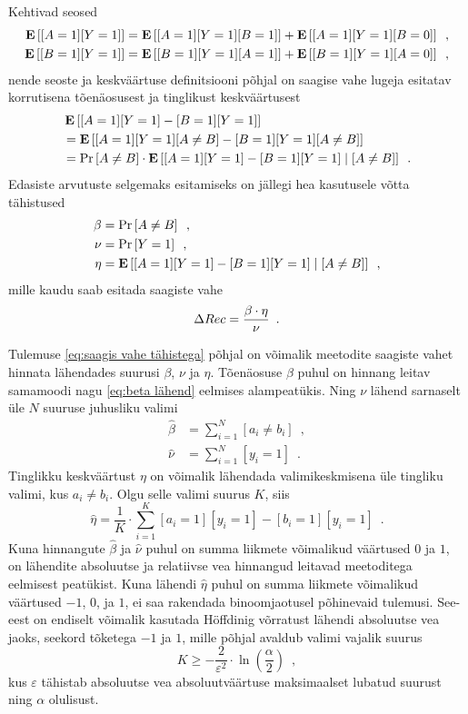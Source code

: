 Kehtivad seosed
\begin{align*}
    \operatorname*{\mathbf{E}}\left[[A=1][Y=1]\right] &= \operatorname*{\mathbf{E}}\left[[A=1][Y=1][B=1]\right] + \operatorname*{\mathbf{E}}\left[[A=1][Y=1][B=0]\right] \enspace, \\
    \operatorname*{\mathbf{E}}\left[[B=1][Y=1]\right] &= \operatorname*{\mathbf{E}}\left[[B=1][Y=1][A=1]\right] + \operatorname*{\mathbf{E}}\left[[B=1][Y=1][A=0]\right] \enspace,
\end{align*}
nende seoste ja keskväärtuse definitsiooni põhjal on saagise vahe lugeja esitatav korrutisena tõenäosusest ja tinglikust keskväärtusest
\begin{align*}
    &\operatorname*{\mathbf{E}}\left[[A=1][Y=1]-[B=1][Y=1]\right] \\
    &=\operatorname*{\mathbf{E}}\left[[A=1][Y=1][A\neq B]-[B=1][Y=1][A\neq B]\right] \\
    &=\Pr\left[A\neq B\right]\cdot\operatorname*{\mathbf{E}}\left[[A=1][Y=1]-[B=1][Y=1] \mid [A\neq B]\right] \enspace.
\end{align*}
Edasiste arvutuste selgemaks esitamiseks on jällegi hea kasutusele võtta tähistused
\begin{align*}
    \beta&=\Pr\left[A\neq B\right] \enspace, \\
    \nu&=\Pr\left[Y=1\right] \enspace, \\
    \eta&=\operatorname*{\mathbf{E}}\left[[A=1][Y=1]-[B=1][Y=1] \mid [A\neq B]\right] \enspace,
\end{align*}
mille kaudu saab esitada saagiste vahe
\begin{equation}
    \label{eq:saagis vahe tähistega}
    \Delta Rec=\frac{\beta\cdot\eta}{\nu} \enspace.
\end{equation}

Tulemuse \eqref{eq:saagis vahe tähistega} põhjal on võimalik meetodite saagiste vahet hinnata lähendades suurusi $\beta$, $\nu$ ja $\eta$. Tõenäosuse $\beta$ puhul on hinnang leitav samamoodi nagu \eqref{eq:beta lähend} eelmises alampeatükis. Ning $\nu$ lähend sarnaselt üle $N$ suuruse juhusliku valimi
\begin{align*}
    \hat{\beta}&=\sum_{i=1}^N [a_i \neq b_i] \enspace, \\
    \hat{\nu}&=\sum_{i=1}^N [y_i = 1] \enspace.
\end{align*}
Tinglikku keskväärtust $\eta$ on võimalik lähendada valimikeskmisena üle tingliku valimi, kus $a_i \neq b_i$. Olgu selle valimi suurus $K$, siis
\begin{equation*}
    \hat{\eta}=\frac{1}{K}\cdot\sum_{i=1}^K [a_i=1][y_i=1]-[b_i=1][y_i=1] \enspace.
\end{equation*}
Kuna hinnangute $\hat{\beta}$ ja $\hat{\nu}$ puhul on summa liikmete võimalikud väärtused $0$ ja $1$, on lähendite absoluutse ja relatiivse vea hinnangud leitavad meetoditega eelmisest peatükist. Kuna lähendi $\hat{\eta}$ puhul on summa liikmete võimalikud väärtused $-1$, $0$, ja $1$, ei saa rakendada binoomjaotusel põhinevaid tulemusi. See-eest on endiselt võimalik kasutada Höffdinig võrratust lähendi absoluutse vea jaoks, seekord tõketega $-1$ ja $1$, mille põhjal avaldub valimi vajalik suurus
\begin{equation*}
    K \geq - \frac{2}{\varepsilon^2} \cdot \ln{\left( \frac{\alpha}{2} \right)} \enspace,
\end{equation*}
kus $\varepsilon$ tähistab absoluutse vea absoluutväärtuse maksimaalset lubatud suurust ning $\alpha$ olulisust.

